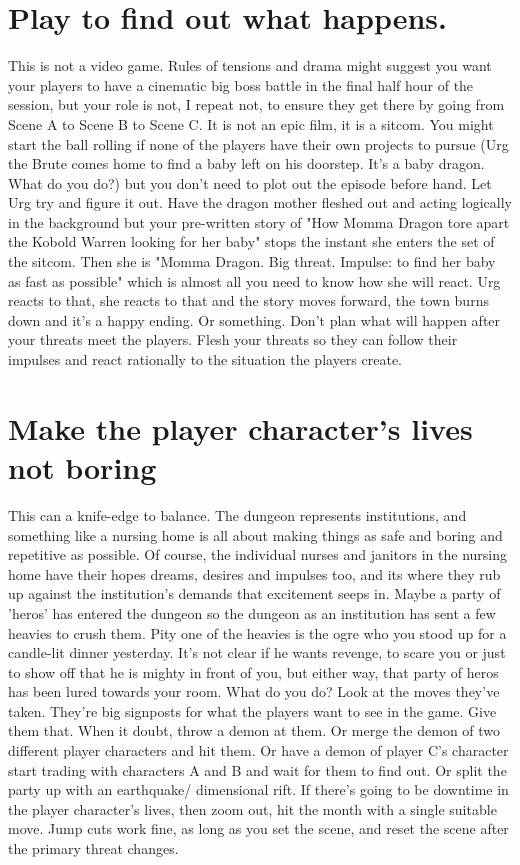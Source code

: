 \documentclass{tufte-book}
\begin{document}
\section{Play to find out what happens.}
This is not a video game. Rules of tensions and drama might suggest you want your players to have a cinematic big boss battle in the final half hour of the session, but your role is not, I repeat not, to ensure they get there by going from Scene A to Scene B to Scene C. It is not an epic film, it is a sitcom. You might start the ball rolling if none of the players have their own projects to pursue (Urg the Brute comes home to find a baby left on his doorstep. It's a baby dragon. What do you do?) but you don't need to plot out the episode before hand. Let Urg try and figure it out. Have the dragon mother fleshed out and acting logically in the background but your pre-written story of "How Momma Dragon tore apart the Kobold Warren looking for her baby" stops the instant she enters the set of the sitcom. Then she is "Momma Dragon. Big threat. Impulse: to find her baby as fast as possible" which is almost all you need to know how she will react. Urg reacts to that, she reacts to that and the story moves forward, the town burns down and it's a happy ending. Or something. Don't plan what will happen after your threats meet the players. Flesh your threats so they can follow their impulses and react rationally to the situation the players create.

\section{Make the player character's lives not boring}
This can a knife-edge to balance. The dungeon represents institutions, and something like a nursing home is all about making things as safe and boring and repetitive as possible. Of course, the individual nurses and janitors in the nursing home have their hopes dreams, desires and impulses too, and its where they rub up against the institution's demands that excitement seeps in. Maybe a party of 'heros' has entered the dungeon so the dungeon as an institution has sent a few heavies to crush them. Pity one of the heavies is the ogre who you stood up for a candle-lit dinner yesterday. It's not clear if he wants revenge, to scare you or just to show off that he is mighty in front of you, but either way, that party of heros has been lured towards your room. What do you do?
 Look at the moves they've taken. They're big signposts for what the players want to see in the game. Give them that. When it doubt, throw a demon at them. Or merge the demon of two different player characters and hit them. Or have a demon of player C's character start trading with characters A and B and wait for them to find out. Or split the party up with an earthquake/ dimensional rift. If there's going to be downtime in the player character's lives, then zoom out, hit the month with a single suitable move. Jump cuts work fine, as long as you set the scene, and reset the scene after the primary threat changes.
\end{document}
